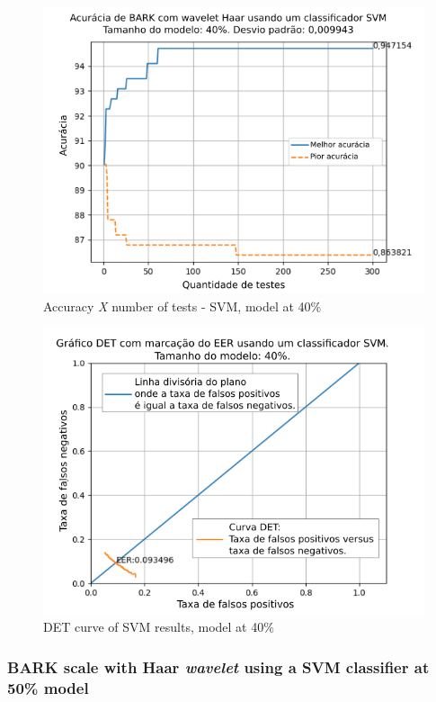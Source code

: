 			\begin{figure}[ht]
				\centering
				\includegraphics[width=.95\linewidth]{images/results/confusionMatrices/classifier_SVM_40.png}
				\caption{Accuracy \textit{X} number of tests - SVM, model at 40\%}
				\label{fig:classifiersvm40}
			\end{figure}
			
			\begin{figure}[!h]
				\centering
				\includegraphics[width=.9\linewidth]{images/results/det/DET_SVM_40}
				\caption{DET curve of SVM results, model at 40\%}
				\label{fig:detsvm40}
			\end{figure}
		
		\subsubsection{BARK scale with Haar \textit{wavelet} using a SVM classifier at 50\% model}
			
